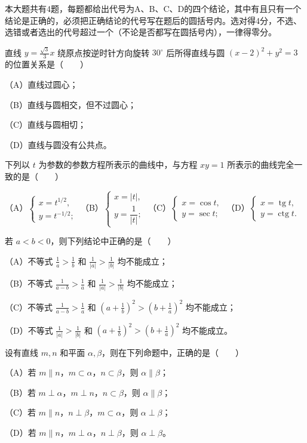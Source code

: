本大题共有4题，每题都给出代号为A、B、C、D的四个结论，其中有且只有一个结论是正确的，必须把正确结论的代号写在题后的圆括号内。选对得4分，不选、选错或者选出的代号超过一个（不论是否都写在圆括号内），一律得零分。

\begin{question}
直线 $y=\frac{\sqrt3}{3}x$ 绕原点按逆时针方向旋转 $30^\circ$ 后所得直线与圆 $(x-2)^2+y^2=3$ 的位置关系是\mbox{（　　）}

（A）直线过圆心；

（B）直线与圆相交，但不过圆心；

（C）直线与圆相切；

（D）直线与圆没有公共点。

\end{question}
\begin{question}
下列以 $t$ 为参数的参数方程所表示的曲线中，与方程 $xy=1$ 所表示的曲线完全一致的是\mbox{（　　）}

（A）$\begin{cases}x=t^{1/2},\\ y=t^{-1/2};\end{cases}$
（B）$\begin{cases}x=|t|,\\ y=\dfrac1{|t|};\end{cases}$
（C）$\begin{cases}x=\cos t,\\ y=\sec t;\end{cases}$
（D）$\begin{cases}x=\operatorname{tg}t,\\ y=\operatorname{ctg}t.\end{cases}$

\end{question}
\begin{question}
若 $a<b<0$，则下列结论中正确的是\mbox{（　　）}

（A）不等式 $\frac1a>\frac1b$ 和 $\frac1{|a|}>\frac1{|b|}$ 均不能成立；

（B）不等式 $\frac1{a-b}>\frac1a$ 和 $\frac1{|a|}>\frac1{|b|}$ 均不能成立；

（C）不等式 $\frac1{a-b}>\frac1a$ 和 $\left(a+\frac1b\right)^2>\left(b+\frac1a\right)^2$ 均不能成立；

（D）不等式 $\frac1{|a|}>\frac1{|b|}$ 和 $\left(a+\frac1b\right)^2>\left(b+\frac1a\right)^2$ 均不能成立。

\end{question}
\begin{question}
设有直线 $m,n$ 和平面 $\alpha,\beta$，则在下列命题中，正确的是\mbox{（　　）}

（A）若 $m\parallel n$，$m\subset\alpha$，$n\subset\beta$，则 $\alpha\parallel\beta$；

（B）若 $m\perp\alpha$，$m\perp n$，$n\subset\beta$，则 $\alpha\parallel\beta$；

（C）若 $m\parallel n$，$n\perp\beta$，$m\subset\alpha$，则 $\alpha\perp\beta$；

（D）若 $m\parallel n$，$m\perp\alpha$，$n\perp\beta$，则 $\alpha\perp\beta$。

\end{question}


